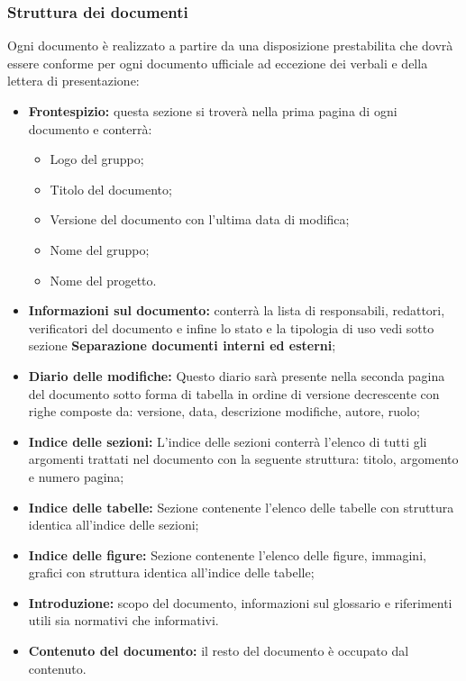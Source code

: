 \documentclass[NormeDiProgetto.tex]{subfiles}
\begin{document}
	\subsubsection{Struttura dei documenti}
		Ogni documento è realizzato a partire da una disposizione prestabilita che dovrà essere conforme per ogni documento ufficiale ad eccezione dei verbali e della lettera di presentazione:
		\begin{itemize}
			\item \textbf{Frontespizio:} questa sezione si troverà nella prima pagina di ogni documento e conterrà:
			\begin{itemize}
				\item Logo del gruppo;
				\item Titolo del documento;
				\item Versione del documento con l'ultima data di modifica;
				\item Nome del gruppo;
				\item Nome del progetto.
			\end{itemize}
			
			\item \textbf{Informazioni sul documento:} conterrà la lista di responsabili,
			redattori, verificatori del documento e infine lo stato e la tipologia di uso vedi sotto sezione \textbf{Separazione documenti interni ed esterni};
			
			\item \textbf{Diario delle modifiche:}
			Questo diario sarà presente nella seconda pagina del documento sotto forma di tabella in ordine di versione decrescente con righe composte da: versione, data, descrizione modifiche, autore, ruolo;
			
			\item \textbf{Indice delle sezioni:}
			L'indice delle sezioni conterrà l'elenco di tutti gli argomenti trattati nel documento con la seguente struttura: titolo, argomento e numero pagina;
			
			\item \textbf{Indice delle tabelle:}
			Sezione contenente l'elenco delle tabelle con struttura identica all'indice delle sezioni;
			
			\item \textbf{Indice delle figure:}
			Sezione contenente l'elenco delle figure, immagini, grafici con struttura identica all'indice delle tabelle;
			
			\item \textbf{Introduzione:}
			scopo del documento, informazioni sul glossario e riferimenti utili sia normativi che informativi.
			 
			\item \textbf{Contenuto del documento:} il resto del documento è occupato dal contenuto.
			
			
		\end{itemize}
		
\end{document}
